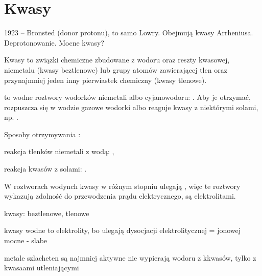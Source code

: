 \section{Kwasy}
1923 -- Bronsted (donor protonu), to samo Lowry.
Obejmują kwasy Arrheniusa.
Deprotonowanie.
Mocne kwasy?



Kwasy to związki chemiczne zbudowane z wodoru oraz reszty kwasowej, niemetalu (kwasy beztlenowe) lub grupy atomów zawierającej tlen oraz przynajmniej jeden inny pierwiastek chemiczny (kwasy tlenowe).

 to wodne roztwory wodorków niemetali albo cyjanowodoru: .
Aby je otrzymać, rozpuszcza się w wodzie gazowe wodorki albo reaguje kwasy z niektórymi solami, np. .

Sposoby otrzymywania :
\begin{compactitem}
\item reakcja tlenków niemetali z wodą: ,
\item reakcja kwasów z solami: .
\end{compactitem}

W roztworach wodynch kwasy w różnym stopniu ulegają , więc te roztwory wykazują zdolność do przewodzenia prądu elektrycznego, są elektrolitami.

kwasy: beztlenowe, tlenowe

kwasy wodne to elektrolity, bo ulegają dysocjacji elektrolitycznej = jonowej
mocne - slabe


metale szlacheten są najmniej aktywne nie wypierają wodoru z kkwasów, tylko z kwasaami utleniającymi
